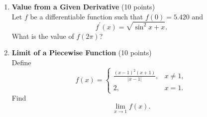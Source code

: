 \begin{enumerate}
  \item \textbf{Value from a Given Derivative} (10 points)\\
  Let $f$ be a differentiable function such that $f(0)=5.420$ and
  \[
    f^{\prime}(x)=\sqrt{\sin^2 x + x}.
  \]
  What is the value of $f(2\pi)$?
  \begin{subanswer}
  \end{subanswer}

  \item \textbf{Limit of a Piecewise Function} (10 points)\\
  Define
  \[
    f(x) =
    \begin{cases}
      \displaystyle \frac{(x-1)^2 (x+1)}{|x-1|}, & x \neq 1,\\[8pt]
      2, & x=1.
    \end{cases}
  \]
  Find
  \[
    \lim_{x\to 1} f(x).
  \]
  \begin{subanswer}
  \end{subanswer}






  

\end{enumerate}
